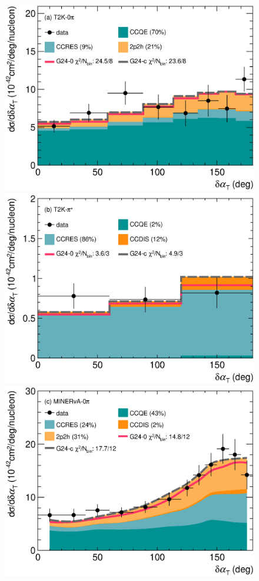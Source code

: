 \begin{figure} 
    \centering 		
    \includegraphics[width=\dbfigwid\textwidth]{figures/0026-t2k_0pi_dalphat_reac_decomp.eps}
    \includegraphics[width=\dbfigwid\textwidth]{figures/0026-t2k_pip_dalphat_reac_decomp.eps}
    \includegraphics[width=\dbfigwid\textwidth]{figures/0026-min_0pi_dalphat_reac_decomp.eps}

\end{figure}
